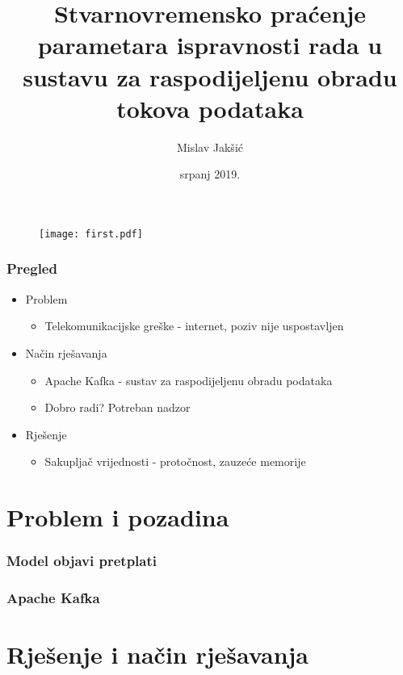 \documentclass[usenames,dvipsnames]{beamer}
\title[Praćenje parametara ispravnosti]{Stvarnovremensko praćenje parametara ispravnosti rada u sustavu za raspodijeljenu obradu tokova podataka}
\author{Mislav Jakšić}
\institute[FER]
{
Sveučilište u Zagrebu \\
\medskip
\textit{jaksicmislav@gmail.com}
}
\date{srpanj 2019.}
\begin{document}
\begin{frame}
\begin{figure}[H]
    \centering
    \texttt{[image: first.pdf]}
\end{figure}
\end{frame}



\begin{frame}
\frametitle{Pregled}

\begin{itemize}
  \item Problem
  \begin{itemize}
    \item Telekomunikacijske greške - internet, poziv nije uspostavljen
  \end{itemize}
  \item Način rješavanja
  \begin{itemize}
    \item Apache Kafka - sustav za raspodijeljenu obradu podataka
    \item Dobro radi? Potreban nadzor
  \end{itemize}
  \item Rješenje
  \begin{itemize}
    \item Sakupljač vrijednosti - protočnost, zauzeće memorije
  \end{itemize}
\end{itemize}
\end{frame}



\section{Problem i pozadina}

\begin{frame}
\frametitle{Model objavi pretplati}

\centering

\end{frame}

\begin{frame}
\frametitle{Apache Kafka}

\centering

\end{frame}



\section{Rješenje i način rješavanja}
\end{document}
